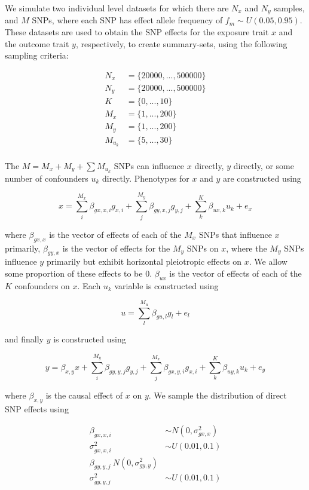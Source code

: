 \documentclass[]{article}
\begin{document}
We simulate two individual level datasets for which there are \(N_x\)
and \(N_y\) samples, and \(M\) SNPs, where each SNP has effect allele
frequency of \(f_m \sim U(0.05, 0.95)\). These datasets are used to
obtain the SNP effects for the exposure trait \(x\) and the outcome
trait \(y\), respectively, to create summary-sets, using the following
sampling criteria:

\[
\begin{aligned}
N_x & = \{20000, ..., 500000\} \\
N_y & = \{20000, ..., 500000\} \\
K & = \{0, ..., 10\} \\
M_x & = \{1, ..., 200\} \\
M_y & = \{1, ..., 200\} \\
M_{u_k} & = \{5,..., 30\} \\
\end{aligned}
\]

The \(M = M_x + M_y + \sum{M_{u_k}}\) SNPs can influence \(x\) directly,
\(y\) directly, or some number of confounders \(u_{k}\) directly.
Phenotypes for \(x\) and \(y\) are constructed using

\[
x = \sum^{M_x}_{i}{\beta_{gx,x,i}g_{x,i}} + \sum^{M_y}_{j}{\beta_{gy,x,j}g_{y,j}} + \sum^{K}_{k}{\beta_{ux,k} u_{k}} + e_{x}
\]

where \(\beta_{gx,x}\) is the vector of effects of each of the \(M_x\)
SNPs that influence \(x\) primarily, \(\beta_{gy,x}\) is the vector of
effects for the \(M_y\) SNPs on \(x\), where the \(M_y\) SNPs influence
\(y\) primarily but exhibit horizontal pleiotropic effects on \(x\). We
allow some proportion of these effects to be 0. \(\beta_{ux}\) is the
vector of effects of each of the \(K\) confounders on \(x\). Each
\(u_{k}\) variable is constructed using

\[
u = \sum^{M_u}_{l}{\beta_{gu,l}g_{l}} + e_{l}
\]

and finally \(y\) is constructed using

\[
y = \beta_{x,y}x + \sum^{M_y}_{i}{\beta_{gy,y,j}g_{y,j}} + \sum^{M_x}_{j}{\beta_{gx,y,i}g_{x,i}} + \sum^{K}_{k}{\beta_{uy,k} u_{k}} + e_{y}
\]

where \(\beta_{x,y}\) is the causal effect of \(x\) on \(y\). We sample
the distribution of direct SNP effects using

\[
\begin{aligned}
\beta_{gx,x,i} & \sim N(0, \sigma^2_{gx,x}) \\
\sigma^2_{gx,x,i} & \sim U(0.01, 0.1) \\
\beta_{gy,y,j} ~ N(0, \sigma^2_{gy,y}) \\
\sigma^2_{gy,y,j} & \sim U(0.01, 0.1) \\
\end{aligned}
\]
\end{document}
